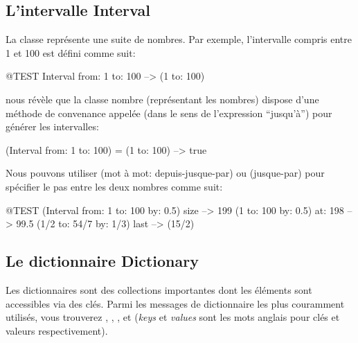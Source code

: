 \documentclass[a4paper,10pt,twoside]{book}
\begin{document}

\subsection{L'intervalle Interval}
La classe  représente une suite de nombres.
Par exemple, l'intervalle compris entre 1 et 100 est défini comme
suit:
\begin{code}{@TEST}
Interval from: 1 to: 100 --> (1 to: 100)
\end{code}

\noindent
{} nous révèle que la classe nombre  (représentant les nombres) dispose d'une méthode de convenance appelée  (dans le sens de l'expression ``jusqu'à'') pour générer les intervalles:

\begin{code}{}
(Interval from: 1 to: 100) = (1 to: 100) --> true
\end{code}

Nous pouvons utiliser  (mot à mot: depuis-jusque-par) ou
 (jusque-par) pour spécifier le pas entre les deux nombres comme suit:

\begin{code}{@TEST}
(Interval from: 1 to: 100 by: 0.5) size --> 199
(1 to: 100 by: 0.5) at: 198 --> 99.5
(1/2 to: 54/7 by: 1/3) last --> (15/2)
\end{code}

\subsection{Le dictionnaire Dictionary}
Les dictionnaires sont des collections importantes dont les éléments
sont accessibles via des clés.
Parmi les messages de dictionnaire les plus couramment utilisés, vous trouverez  
, , ,  et  (\emph{keys} et \emph{values} sont les mots anglais pour clés et valeurs respectivement).
\end{document}
